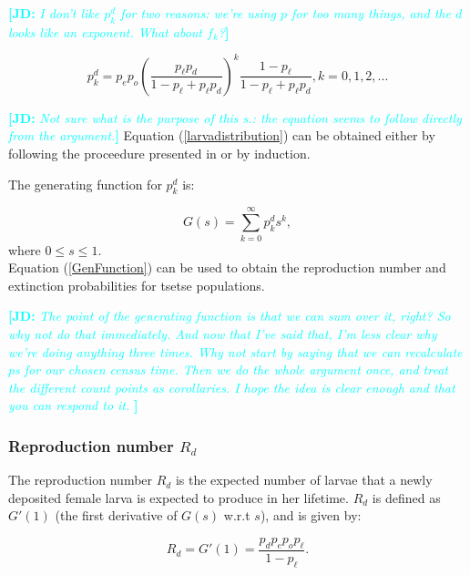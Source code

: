\documentclass[smallextended]{svjour3}
\newcommand{\comment}[3]{\textcolor{#1}{\textbf{[#2: }\textit{#3}\textbf{]}}}
\newcommand{\jd}[1]{\comment{cyan}{JD}{#1}}
\begin{document}
\jd{I don't like $p_{k}^{d}$ for two reasons: we're using $p$ for too many things, and the $d$ looks like an exponent. What about $f_k$?}

\begin{equation}
\label{larvadistribution}
p_{k}^{d} = p_{e}p_{o}(\frac{p_\ell p_d}{1-p_\ell + p_\ell p_d})^{k}\frac{1-p_\ell}{1-p_\ell + p_\ell p_d}, k =0,1,2,...
\end{equation} 

\jd{Not sure what is the purpose of this s.: the equation seems to follow directly from the argument.} Equation (\ref{larvadistribution}) can be obtained either by following the proceedure presented in \cite{Kajunguri2019} or by induction.

\medskip


The generating function for  $p_{k}^{d}$ is:

\begin{equation}
\label{GenFunction}
 G(s) = \sum_{k=0}^{\infty} p_{k}^{d}s^{k},  
\end{equation}
where $ 0\leq s \leq 1.$ \\

Equation (\ref{GenFunction}) can be used to obtain the reproduction number and extinction probabilities for tsetse populations. 

\jd{The point of the generating function is that we can sum over it, right? So why not do that immediately. And now that I've said that, I'm less clear why we're doing anything three times. Why not start by saying that we can recalculate $p$s for our chosen census time. Then we do the whole argument once, and treat the different count points as corollaries. I hope the idea is clear enough and that you can respond to it. }

\subsubsection{Reproduction number $R_{d}$}

The reproduction number $R_{d}$ is the expected number of larvae that a newly deposited female larva is expected to produce in her lifetime. $R_{d}$ is defined as $G'(1)$ (the first derivative of $G(s)$ w.r.t $s$), and is given by:

\begin{equation}
\label{larvareproductiveNum}
R_{d} = G'(1) = \frac{p_{d}p_{e}p_{o}p_\ell}{1-p_\ell}.
\end{equation}  
\end{document}
